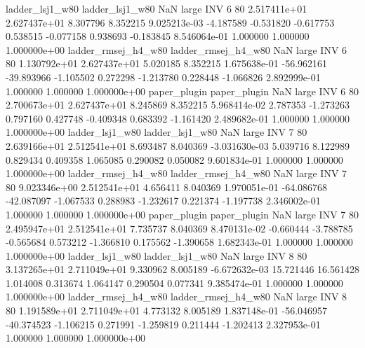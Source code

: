     ladder_lsj1_w80     ladder_lsj1_w80                   NaN      large      INV                 6 80 2.517411e+01   2.627437e+01      8.307796       8.352215  9.025213e-03     -4.187589     -0.531820    -0.617753       0.538515 -0.077158   0.938693    -0.183845   8.546064e-01            1.000000        1.000000        1.000000e+00
ladder_rmsej_h4_w80 ladder_rmsej_h4_w80                   NaN      large      INV                 6 80 1.130792e+01   2.627437e+01      5.020185       8.352215  1.675638e-01    -56.962161    -39.893966    -1.105502       0.272298 -1.213780   0.228448    -1.066826   2.892999e-01            1.000000        1.000000        1.000000e+00
       paper_plugin        paper_plugin                   NaN      large      INV                 6 80 2.700673e+01   2.627437e+01      8.245869       8.352215  5.968414e-02      2.787353     -1.273263     0.797160       0.427748 -0.409348   0.683392    -1.161420   2.489682e-01            1.000000        1.000000        1.000000e+00
    ladder_lsj1_w80     ladder_lsj1_w80                   NaN      large      INV                 7 80 2.639166e+01   2.512541e+01      8.693487       8.040369 -3.031630e-03      5.039716      8.122989     0.829434       0.409358  1.065085   0.290082     0.050082   9.601834e-01            1.000000        1.000000        1.000000e+00
ladder_rmsej_h4_w80 ladder_rmsej_h4_w80                   NaN      large      INV                 7 80 9.023346e+00   2.512541e+01      4.656411       8.040369  1.970051e-01    -64.086768    -42.087097    -1.067533       0.288983 -1.232617   0.221374    -1.197738   2.346002e-01            1.000000        1.000000        1.000000e+00
       paper_plugin        paper_plugin                   NaN      large      INV                 7 80 2.495947e+01   2.512541e+01      7.735737       8.040369  8.470131e-02     -0.660444     -3.788785    -0.565684       0.573212 -1.366810   0.175562    -1.390658   1.682343e-01            1.000000        1.000000        1.000000e+00
    ladder_lsj1_w80     ladder_lsj1_w80                   NaN      large      INV                 8 80 3.137265e+01   2.711049e+01      9.330962       8.005189 -6.672632e-03     15.721446     16.561428     1.014008       0.313674  1.064147   0.290504     0.077341   9.385474e-01            1.000000        1.000000        1.000000e+00
ladder_rmsej_h4_w80 ladder_rmsej_h4_w80                   NaN      large      INV                 8 80 1.191589e+01   2.711049e+01      4.773132       8.005189  1.837148e-01    -56.046957    -40.374523    -1.106215       0.271991 -1.259819   0.211444    -1.202413   2.327953e-01            1.000000        1.000000        1.000000e+00
